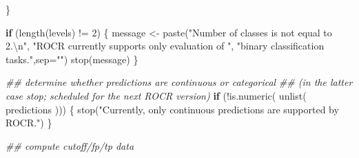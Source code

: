 \documentclass[
  letterpaper,
  DIV=11,
  numbers=noendperiod]{scrartcl}
\newenvironment{Shaded}{\begin{snugshade}}{\end{snugshade}}
\newcommand{\AttributeTok}[1]{\textcolor[rgb]{0.40,0.45,0.13}{#1}}
\newcommand{\ControlFlowTok}[1]{\textcolor[rgb]{0.00,0.23,0.31}{\textbf{#1}}}
\newcommand{\DecValTok}[1]{\textcolor[rgb]{0.68,0.00,0.00}{#1}}
\newcommand{\DocumentationTok}[1]{\textcolor[rgb]{0.37,0.37,0.37}{\textit{#1}}}
\newcommand{\FunctionTok}[1]{\textcolor[rgb]{0.28,0.35,0.67}{#1}}
\newcommand{\NormalTok}[1]{\textcolor[rgb]{0.00,0.23,0.31}{#1}}
\newcommand{\OtherTok}[1]{\textcolor[rgb]{0.00,0.23,0.31}{#1}}
\newcommand{\SpecialCharTok}[1]{\textcolor[rgb]{0.37,0.37,0.37}{#1}}
\newcommand{\StringTok}[1]{\textcolor[rgb]{0.13,0.47,0.30}{#1}}
\begin{document}
\begin{Shaded}
\begin{Highlighting}[]
\NormalTok{    \}}

    \ControlFlowTok{if}\NormalTok{ (}\FunctionTok{length}\NormalTok{(levels) }\SpecialCharTok{!=} \DecValTok{2}\NormalTok{) \{}
\NormalTok{        message }\OtherTok{\textless{}{-}} \FunctionTok{paste}\NormalTok{(}\StringTok{"Number of classes is not equal to 2.}\SpecialCharTok{\textbackslash{}n}\StringTok{"}\NormalTok{,}
                         \StringTok{"ROCR currently supports only evaluation of "}\NormalTok{,}
                         \StringTok{"binary classification tasks."}\NormalTok{,}\AttributeTok{sep=}\StringTok{""}\NormalTok{)}
        \FunctionTok{stop}\NormalTok{(message)}
\NormalTok{    \}}

    \DocumentationTok{\#\# determine whether predictions are continuous or categorical}
    \DocumentationTok{\#\# (in the latter case stop; scheduled for the next ROCR version)}
    \ControlFlowTok{if}\NormalTok{ (}\SpecialCharTok{!}\FunctionTok{is.numeric}\NormalTok{( }\FunctionTok{unlist}\NormalTok{( predictions ))) \{}
        \FunctionTok{stop}\NormalTok{(}\StringTok{"Currently, only continuous predictions are supported by ROCR."}\NormalTok{)}
\NormalTok{    \}}

    \DocumentationTok{\#\# compute cutoff/fp/tp data}


\end{Highlighting}
\end{Shaded}
\end{document}

